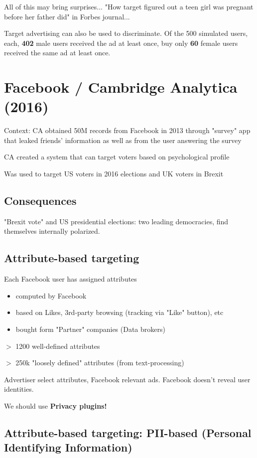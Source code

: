 \documentclass[11pt]{article}
\begin{document}
All of this may bring surprises... "How target figured out a teen girl was pregnant before her father did" in Forbes journal...

Target advertising can also be used to discriminate. Of the 500 simulated users, each, \textbf{402} male users received the ad at least once, buy only \textbf{60} female users received the same ad at least once. 

\section*{Facebook / Cambridge Analytica (2016)}

Context: CA obtained 50M records from Facebook in 2013 through "survey" app that leaked friends' information as well as from the user answering the survey

CA created a system that can target voters based on psychological profile

Was used to target US voters in 2016 elections and UK voters in Brexit

\subsection*{Consequences}

"Brexit vote" and US presidential elections: two leading democracies, find themselves internally polarized. 

\subsection*{Attribute-based targeting}

Each Facebook user has assigned attributes
\begin{itemize}
	\item computed by Facebook
	\item based on Likes, 3rd-party browsing (tracking via "Like" button), etc
	\item bought form "Partner" companies (Data brokers)
\end{itemize}
$>$ 1200 well-defined attributes

$>$ 250k "loosely defined" attributes (from text-processing)

Advertiser select attributes, Facebook relevant ads. Facebook doesn't reveal user identities.

We should use \textbf{Privacy plugins!}

\subsection*{Attribute-based targeting: PII-based (Personal Identifying Information)}
\end{document}
